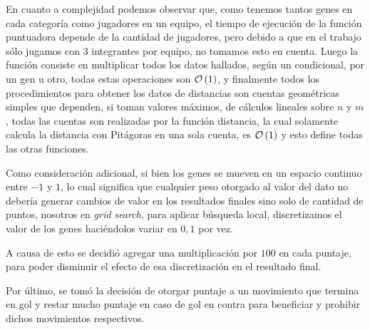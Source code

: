 En cuanto a complejidad podemos observar que, como tenemos tantos genes en cada categoría como jugadores en un
equipo, el tiempo de ejecución de la función puntuadora depende de la cantidad de jugadores,
pero debido a que en el trabajo sólo jugamos con 3 integrantes por equipo, no tomamos esto en cuenta.
Luego la función consiste en multiplicar todos los datos hallados, según un condicional, por un gen u otro,
todas estas operaciones son $\mathcal{O}\left(1\right)$, y finalmente todos los procedimientos para obtener los datos de distancias
son cuentas geométricas simples que dependen, si toman valores máximos, de cálculos lineales sobre $n$ y $m$, todas
las cuentas son realizadas por la función distancia, la cual solamente calcula la distancia con Pitágoras en una sola
cuenta, es $\mathcal{O}\left(1\right)$ y esto define todas las otras funciones.



Como consideración adicional, si bien los genes se mueven en un espacio continuo entre $-1$ y $1$,
lo cual significa que cualquier peso otorgado al valor del dato no debería generar
cambios de valor en los resultados finales sino solo de cantidad de puntos,
nosotros en \emph{grid search}, para aplicar búsqueda local, discretizamos el valor de los
genes haciéndolos variar en $0,1$ por vez.


A causa de esto se decidió agregar una multiplicación por $100$ en cada puntaje,
para poder disminuir el efecto de esa discretización en el resultado final.


Por último, se tomó la decisión de otorgar puntaje a un movimiento que termina
en gol y restar mucho puntaje en caso de gol en contra para beneficiar y
prohibir dichos movimientos respectivos.

